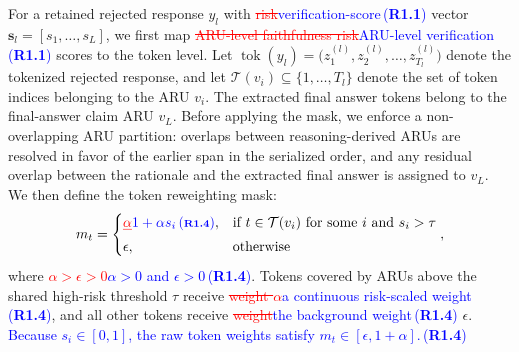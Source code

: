\documentclass[a4paper,fleqn,doubleblind]{cas-sc}
\DeclareRobustCommand{\deleted}[1]{\textcolor{red}{\sout{#1}}}
\DeclareRobustCommand{\added}[1]{\textcolor{blue}{#1}}
\DeclareRobustCommand{\revtag}[1]{\textcolor{blue}{\scriptsize\,(\textbf{#1})}}
\begin{document}
For a retained rejected response $y_l$ with \deleted{risk}\added{verification-score}\revtag{R1.1} vector $\mathbf{s}_l=[s_1,\dots,s_L]$, we first map \deleted{ARU-level faithfulness risk}\added{ARU-level verification}\revtag{R1.1} scores to the token level. Let $\operatorname{tok}(y_l) = \big(z^{(l)}_1, z^{(l)}_2, \dots, z^{(l)}_{T_l}\big)$ denote the tokenized rejected response, and let $\mathcal{T}(v_i) \subseteq \{1, \dots, T_l\}$ denote the set of token indices belonging to the ARU $v_i$. The extracted final answer tokens belong to the final-answer claim ARU $v_L$. Before applying the mask, we enforce a non-overlapping ARU partition: overlaps between reasoning-derived ARUs are resolved in favor of the earlier span in the serialized order, and any residual overlap between the rationale and the extracted final answer is assigned to $v_L$. We then define the token reweighting mask:
\begin{equation}
\label{eq:topology_mask}
m_t =
\begin{cases}
\deleted{\alpha}\added{1+\alpha s_i}\revtag{R1.4}, & \text{if } t \in \mathcal{T}(v_i) \text{ for some } i \text{ and } s_i > \tau \\
\epsilon, & \text{otherwise}
\end{cases},
\end{equation}
where \deleted{$\alpha > \epsilon > 0$}\added{$\alpha>0$ and $\epsilon>0$}\revtag{R1.4}. Tokens covered by ARUs above the shared high-risk threshold $\tau$ receive \deleted{weight $\alpha$}\added{a continuous risk-scaled weight}\revtag{R1.4}, and all other tokens receive \deleted{weight}\added{the background weight}\revtag{R1.4} $\epsilon$. \added{Because $s_i\in[0,1]$, the raw token weights satisfy $m_t\in[\epsilon,1+\alpha]$.}\revtag{R1.4}
\end{document}
